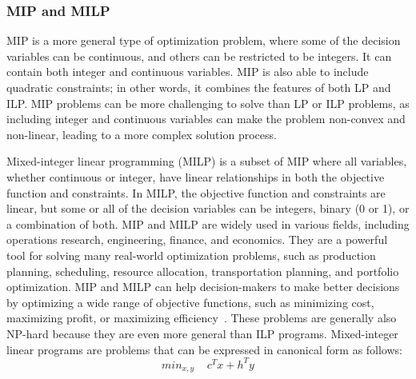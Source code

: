     \subsubsection{MIP and MILP}
    MIP is a more general type of optimization problem, where some of the decision variables can be continuous, and others can be restricted to be integers. It can contain both integer and continuous variables. MIP is also able to include quadratic constraints; in other words, it combines the features of both LP and ILP.  
    MIP problems can be more challenging to solve than LP or ILP problems, as including integer and continuous variables can make the problem non-convex and non-linear, leading to a more complex solution process. 
    
    Mixed-integer linear programming (MILP) is a subset of MIP where all variables, whether continuous or integer, have linear relationships in both the objective function and constraints.
    In MILP, the objective function and constraints are linear, but some or all of the decision variables can be integers, binary (0 or 1), or a combination of both.
    MIP and MILP are widely used in various fields, including operations research, engineering, finance, and economics. They are a powerful tool for solving many real-world optimization problems, such as production planning, scheduling, resource allocation, transportation planning, and portfolio optimization. MIP and MILP can help decision-makers to make better decisions by optimizing a wide range of objective functions, such as minimizing cost, maximizing profit, or maximizing efficiency~\cite{junger200950,vanderbei2020linear}. These problems are generally also NP-hard because they are even more general than ILP programs.
    Mixed-integer linear programs are problems that can be expressed in canonical form as follows:
    \begin{equation*}
        min_{x, y}\;\;\;\;  c^{T} x + h^{T} y
    \end{equation*}
    
